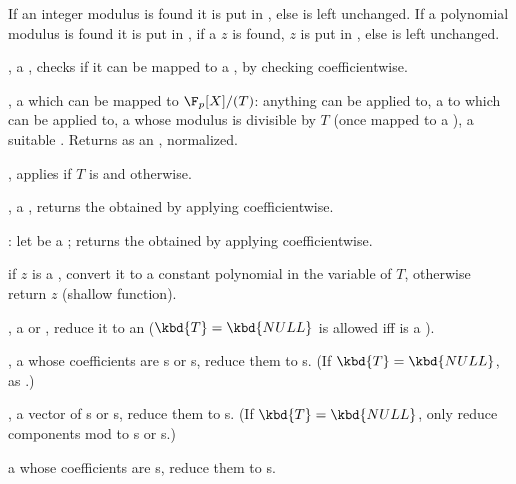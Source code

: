 If an integer modulus is found it is put in , else  is left
unchanged. If a polynomial modulus is found it is put in ,
if a  $z$ is found, $z$ is put in , else
 is left unchanged.

,  a ,
checks if it can be mapped to a , by checking 
coefficientwise.

,  a  which can be
mapped to $\F_p[X]/(T)$: anything  can be applied to,
a  to which  can be applied to, a 
whose modulus is divisible by $T$ (once mapped to a ), a suitable
. Returns  as an , normalized.

, applies  if $T$
is  and  otherwise.

,  a , returns the
 obtained by applying  coefficientwise.

: let  be a ;
returns the  obtained by applying  coefficientwise.

if $z$ is a , convert it to a constant polynomial in the variable of
$T$, otherwise return $z$ (shallow function).

,  a  or ,
reduce it to an  ($\kbd{T} = \kbd{NULL}$ is allowed iff  is a
).

,  a 
whose coefficients are s or s, reduce them to s. (If
$\kbd{T} = \kbd{NULL}$, as .)

,  a vector of s or
s, reduce them to s. (If $\kbd{T} = \kbd{NULL}$, only
reduce components mod  to s or s.)

  a 
whose coefficients are s, reduce them to s.



